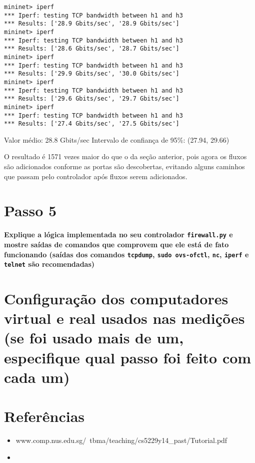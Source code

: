 \documentclass[12pt,letterpaper]{article}
\begin{document}
\begin{verbatim}
mininet> iperf 
*** Iperf: testing TCP bandwidth between h1 and h3 
*** Results: ['28.9 Gbits/sec', '28.9 Gbits/sec'] 
mininet> iperf 
*** Iperf: testing TCP bandwidth between h1 and h3 
*** Results: ['28.6 Gbits/sec', '28.7 Gbits/sec'] 
mininet> iperf 
*** Iperf: testing TCP bandwidth between h1 and h3 
*** Results: ['29.9 Gbits/sec', '30.0 Gbits/sec'] 
mininet> iperf 
*** Iperf: testing TCP bandwidth between h1 and h3 
*** Results: ['29.6 Gbits/sec', '29.7 Gbits/sec'] 
mininet> iperf 
*** Iperf: testing TCP bandwidth between h1 and h3 
*** Results: ['27.4 Gbits/sec', '27.5 Gbits/sec']
\end{verbatim}

Valor médio: 28.8 Gbits/sec
Intervalo de confiança de 95\%: (27.94, 29.66)

O resultado é 1571 vezes maior do que o da seção anterior, pois agora os fluxos são adicionados conforme
as portas são descobertas, evitando alguns caminhos que passam pelo controlador após fluxos serem adicionados.

\section{Passo 5}

\textbf{Explique a lógica implementada no seu controlador
\texttt{firewall.py} e mostre saídas de comandos que comprovem que ele
está de fato funcionando (saídas dos comandos \texttt{tcpdump},
\texttt{sudo ovs-ofctl}, \texttt{nc}, \texttt{iperf} e \texttt{telnet}
são recomendadas)}

\section{Configuração dos computadores virtual e real usados nas
medições (se foi usado mais de um, especifique qual passo foi feito
com cada um)}

\section{Referências}

\begin{itemize}
   \item www.comp.nus.edu.sg/~tbma/teaching/cs5229y14\_past/Tutorial.pdf
   \item
\end{itemize}
\end{document}
